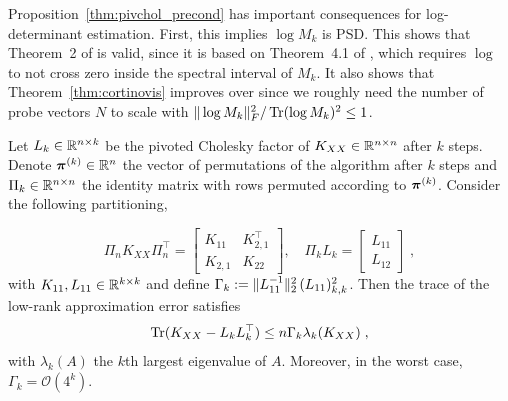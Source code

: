 \documentclass{article}
\begin{document}
\begin{remark}
Proposition~\ref{thm:pivchol_precond} has important consequences for log-determinant estimation. 
First, this implies $\log M_k$ is PSD. This shows that Theorem~2 of \cite{gardner_gpytorch_2021} is valid, since it is based on Theorem~4.1 of \cite{ubaru_fast_2017}, which requires $\log$ to not cross zero inside the spectral interval of $M_k$.
It also shows that Theorem~\ref{thm:cortinovis} improves over \cite{gardner_gpytorch_2021} since we roughly need the number of probe vectors $N$ to scale with $\Vert \log M_k \Vert_F^2 / \operatorname{Tr}(\log M_k)^2 \le 1$. 
\end{remark}


\begin{theorem} \label{thm:pivchol_decay}

Let $L_k \in \mathbb R^{n\times k}$ be the pivoted Cholesky factor of $K_{XX} \in \mathbb R^{n\times n}$ after $k$ steps. 
Denote $\boldsymbol{\mathbf{\pi}}^{(k)} \in \mathbb R^n$ the vector of permutations of the algorithm after $k$ steps and $\Pi_k \in \mathbb R^{n\times n}$ the identity matrix with rows permuted according to $\boldsymbol{\mathbf{\pi}}^{(k)}$. Consider the following partitioning,

\begin{equation*}
    \Pi_n K_{XX} \Pi_n^\top = \begin{bmatrix}
    K_{11} & K_{2,1}^\top \\ K_{2,1} & K_{22}
    \end{bmatrix}, \quad
    \Pi_k L_k = \begin{bmatrix}
    L_{11} \\ L_{12}
    \end{bmatrix} \; ,
\end{equation*}
%
with $K_{11}, L_{11} \in \mathbb R^{k\times k}$ and define $\Gamma_k := \Vert L_{11}^{-1} \Vert_2^2 \, (L_{11})_{k, k}^2$. 
Then the trace of the low-rank approximation error satisfies
\begin{equation}
    \operatorname{Tr}(K_{XX} - L_kL_k^\top) \le n \Gamma_k \lambda_k(K_{XX}) \;,
\end{equation}
%
with $\lambda_k(A)$ the $k$th largest eigenvalue of $A$. Moreover, in the worst case, $\Gamma_k = \mathcal O(4^k)$. 
\end{theorem}
\end{document}
